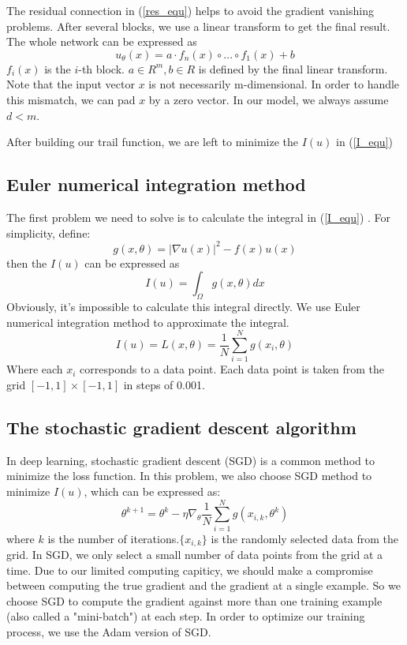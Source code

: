 \documentclass{article}
\begin{document}
\par The residual connection in (\ref{res_equ})   %
helps to avoid the gradient vanishing problems.
After several blocks, we use a linear transform to get the final result. The whole network can be expressed as
\begin{equation}
u_{\theta}(x)=a\cdot f_n(x) \circ ...\circ f_1(x)+b
\end{equation}
$f_i(x)$ is the $i$-th block. $a\in R^m,b\in R$ is defined by the final linear transform. Note that the input vector $x$ is not necessarily m-dimensional. In order to handle this mismatch, we can pad $x$ by a zero vector. In our model, we always assume $d<m$.
\par After building our trail function, we are left to minimize the $I(u)$ in (\ref{I_equ})

\subsection{Euler numerical integration method}   %
\par The first problem we need to solve is to calculate the integral in (\ref{I_equ})
 . For simplicity, define:
 \begin{equation}
 g(x,\theta)=|\nabla u(x)|^2-f(x)u(x)
 \end{equation}
 then the $I(u)$ can be expressed as
 \begin{equation}
 I(u)=\int _{\Omega}g(x,\theta)dx
 \end{equation}
 Obviously, it's impossible to calculate this integral directly. We use Euler numerical integration method to approximate the integral.
 \begin{equation}
 I(u)=L(x,\theta)=\frac{1}{N}\sum\limits_{i=1}^{N}g(x_i,\theta)
 \end{equation}
 Where each $x_i$ corresponds to a data point. Each data point is taken from the grid $[-1,1]\times [-1,1]$ in steps of 0.001.
 \subsection{The stochastic gradient descent algorithm}
 In deep learning, stochastic gradient descent (SGD) is a common method to minimize the loss function. In this problem, we also choose SGD method to minimize $I(u)$, which can be expressed as:
 \begin{equation}
 \theta^{k+1}=\theta^{k}-\eta \nabla_{\theta}\frac{1}{N}\sum\limits_{i=1}^{N}g(x_{i,k},\theta^k)
 \end{equation}
 where $k$ is the number of iterations.$\{x_{i,k}\}$ is the randomly selected data from the grid. In SGD, we only select a small number of data points from the grid at a time. Due to our limited computing capiticy, we should make a compromise  between computing the true gradient and the gradient at a single example. So we choose SGD to compute the gradient against more than one training example (also called a "mini-batch") at each step. In order to optimize our training process, we use the Adam version of SGD.
\end{document}
